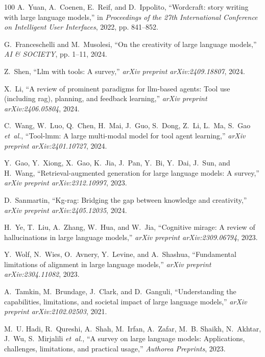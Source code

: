 \documentclass[10pt,journal,compsoc]{IEEEtran}
\begin{document}
\begin{thebibliography}{100}
	A.~Yuan, A.~Coenen, E.~Reif, and D.~Ippolito, ``Wordcraft: story writing with
	large language models,'' in \emph{Proceedings of the 27th International
		Conference on Intelligent User Interfaces}, 2022, pp. 841--852.
	
	G.~Franceschelli and M.~Musolesi, ``On the creativity of large language
	models,'' \emph{AI \& SOCIETY}, pp. 1--11, 2024.
	
	Z.~Shen, ``Llm with tools: A survey,'' \emph{arXiv preprint arXiv:2409.18807},
	2024.
	
	X.~Li, ``A review of prominent paradigms for llm-based agents: Tool use
	(including rag), planning, and feedback learning,'' \emph{arXiv preprint
		arXiv:2406.05804}, 2024.
	
	C.~Wang, W.~Luo, Q.~Chen, H.~Mai, J.~Guo, S.~Dong, Z.~Li, L.~Ma, S.~Gao
	\emph{et~al.}, ``Tool-lmm: A large multi-modal model for tool agent
	learning,'' \emph{arXiv preprint arXiv:2401.10727}, 2024.
	
	Y.~Gao, Y.~Xiong, X.~Gao, K.~Jia, J.~Pan, Y.~Bi, Y.~Dai, J.~Sun, and H.~Wang,
	``Retrieval-augmented generation for large language models: A survey,''
	\emph{arXiv preprint arXiv:2312.10997}, 2023.
	
	D.~Sanmartin, ``Kg-rag: Bridging the gap between knowledge and creativity,''
	\emph{arXiv preprint arXiv:2405.12035}, 2024.
	
	H.~Ye, T.~Liu, A.~Zhang, W.~Hua, and W.~Jia, ``Cognitive mirage: A review of
	hallucinations in large language models,'' \emph{arXiv preprint
		arXiv:2309.06794}, 2023.
	
	Y.~Wolf, N.~Wies, O.~Avnery, Y.~Levine, and A.~Shashua, ``Fundamental
	limitations of alignment in large language models,'' \emph{arXiv preprint
		arXiv:2304.11082}, 2023.
	
	A.~Tamkin, M.~Brundage, J.~Clark, and D.~Ganguli, ``Understanding the
	capabilities, limitations, and societal impact of large language models,''
	\emph{arXiv preprint arXiv:2102.02503}, 2021.
	
	M.~U. Hadi, R.~Qureshi, A.~Shah, M.~Irfan, A.~Zafar, M.~B. Shaikh, N.~Akhtar,
	J.~Wu, S.~Mirjalili \emph{et~al.}, ``A survey on large language models:
	Applications, challenges, limitations, and practical usage,'' \emph{Authorea
		Preprints}, 2023.
	

\end{thebibliography}
\end{document}
